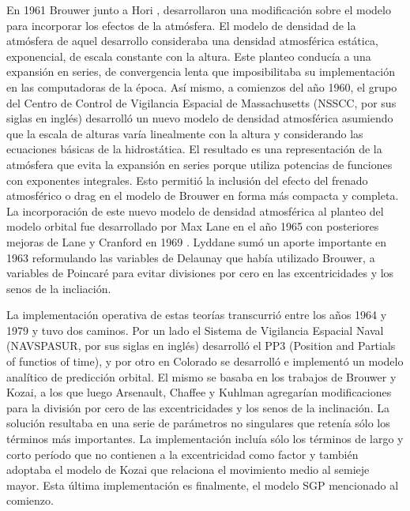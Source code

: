 {En 1961 Brouwer junto a Hori \citep{brouwer1961theoretical}, desarrollaron una modificaci\'on sobre el modelo para incorporar los efectos de la atm\'osfera. El modelo de densidad de la atm\'osfera de aquel desarrollo consideraba una densidad atmosf\'erica est\'atica, exponencial, de escala constante con la altura. Este planteo conduc\'ia a una expansi\'on en series, de convergencia lenta que imposibilitaba su implementaci\'on en las computadoras de la \'epoca. As\'i mismo, a comienzos del a\~no 1960, el grupo del Centro de Control de Vigilancia Espacial de Massachusetts (NSSCC, por sus siglas en ingl\'es) desarroll\'o un nuevo modelo de densidad atmosf\'erica asumiendo que la escala de alturas var\'ia linealmente con la altura y considerando las ecuaciones b\'asicas de la hidrost\'atica. El resultado es una representaci\'on de la atm\'osfera que evita la expansi\'on en series porque utiliza potencias de funciones con exponentes integrales. Esto permiti\'o la inclusi\'on del efecto del frenado atmosf\'erico o drag en el modelo de Brouwer en forma m\'as compacta y completa. La incorporaci\'on de este nuevo modelo de densidad atmosf\'erica al planteo del modelo orbital fue desarrollado por Max Lane en el a\~no 1965 \citep{lane1965development} con posteriores mejoras de Lane y Cranford en 1969 \citep{cranfordimproved}. Lyddane \citep{lyddane1963small} sum\'o un aporte importante en 1963 reformulando las variables de Delaunay que hab\'ia utilizado Brouwer, a variables de Poincar\'e para evitar divisiones por cero en las excentricidades y los senos de la incliaci\'on.

La implementaci\'on operativa de estas teor\'ias transcurri\'o entre los a\~nos 1964 y 1979 y tuvo dos caminos. Por un lado el Sistema de Vigilancia Espacial Naval (NAVSPASUR, por sus siglas en ingl\'es) desarroll\'o el PP3 (Position and Partials of functios of time), y por otro en Colorado se desarroll\'o e implement\'o un modelo anal\'itico de predicci\'on orbital. El mismo se basaba en los trabajos de Brouwer y Kozai, a los que luego Arsenault, Chaffee y Kuhlman \citep{arsenault1964general} agregar\'ian modificaciones para la divisi\'on por cero de las excentricidades y los senos de la inclinaci\'on. La soluci\'on resultaba en una serie de par\'ametros no singulares que reten\'ia s\'olo los t\'erminos m\'as importantes. La implementaci\'on inclu\'ia s\'olo los t\'erminos de largo y corto per\'iodo que no contienen a la excentricidad como factor y tambi\'en adoptaba el modelo de Kozai que relaciona el movimiento medio al semieje mayor. Esta \'ultima implementaci\'on es finalmente, el modelo SGP mencionado al comienzo.

}
